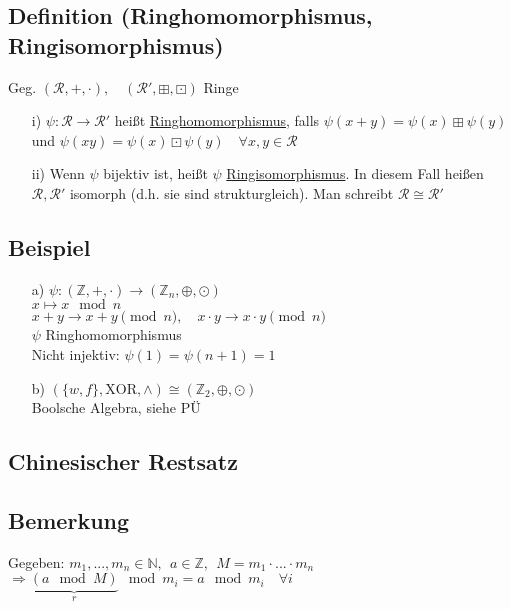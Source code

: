 \documentclass[a4paper, 12pt,titlepage, pdf, headsepline]{scrartcl}
\newcommand{\uline}[1]{\underline{#1}}
\renewcommand{\>}{\rightarrow}
\renewcommand{\*}{\cdot}
\begin{document}
	      \subsection{Definition (Ringhomomorphismus, Ringisomorphismus)}
	      Geg. $(\mathcal{R}, + , \cdot),\quad (\mathcal{R}', \boxplus, \boxdot)$  Ringe
	      \begin{itemize}
	      	\item[i)]$\psi: \mathcal{R} \rightarrow \mathcal{R}'$ heißt \uline{Ringhomomorphismus}, falls $\psi(x+y) = \psi(x) \boxplus \psi(y)$ und $\psi(xy)= \psi(x) \boxdot \psi(y)\quad \forall x,y \in \mathcal{R}$
	      	\item[ii)] Wenn $\psi$ bijektiv ist, heißt $\psi$ \uline{Ringisomorphismus}. In diesem Fall heißen $\mathcal{R}, \mathcal{R}'$ isomorph (d.h. sie sind strukturgleich). Man schreibt $\mathcal{R} \cong \mathcal{R}'$
	      \end{itemize}
	      	
	      \subsection{Beispiel}
	      \begin{itemize}
	      	\item[a)] $\psi: (\mathds{Z}, + ,\cdot) \rightarrow (\mathds{Z}_n,\oplus, \odot)$\\
	      	      \noindent\hspace*{17mm}$x \mapsto x \mod n$\\
	      	      $x +y \rightarrow x+y \pmod{n},\quad x \cdot y \rightarrow x \cdot y \pmod{n}$\\
	      	      $\psi$ Ringhomomorphismus\\
	      	      Nicht injektiv: $\psi(1)=\psi(n+1)=1$
	      	\item[b)]  $(\{w,f\}, \text{XOR}, \land) \cong (\mathds{Z}_2, \oplus, \odot)$\\
	      	      Boolsche Algebra, siehe PÜ
	      \end{itemize}
	      \subsection*{Chinesischer Restsatz}
	      \subsection{Bemerkung}
	      \label{4.10}
	      Gegeben: $m_1,...,m_n \in \mathds{N},~~ a \in \mathds{Z},~~ M = m_1 \cdot ... \cdot m_n$ \\
	      \noindent\hspace*{11mm}$\Rightarrow\underbrace{(a \mod M)}_{r} \mod m_i = a \mod m_i \quad\forall i$
\end{document}
